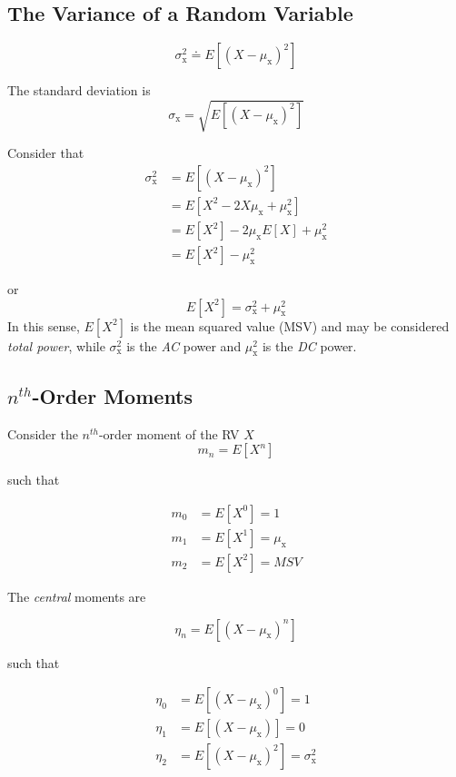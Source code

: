\documentclass[12pt]{book}
\theoremstyle{definition}
\begin{document}
\subsection{The Variance of a Random Variable}


\[
\sigma_\mathrm{x}^2 \doteq E[(X - \mu_\mathrm{x})^2]
\]

The standard deviation is
\[
\sigma_\mathrm{x} = \sqrt{E[(X - \mu_\mathrm{x})^2]}
\]

Consider that 
\[    \begin{split}
        \sigma_\mathrm{x}^2  & = E[(X - \mu_\mathrm{x})^2]\\
                    & = E[X^2 - 2X\mu_\mathrm{x} + \mu_\mathrm{x}^2]\\
                    & = E[X^2] - 2\mu_\mathrm{x} E[X] +\mu_\mathrm{x}^2\\
                    & = E[X^2] - \mu_\mathrm{x}^2
\end{split}
\]

or 
\[
E[X^2] = \sigma_\mathrm{x}^2 + \mu_\mathrm{x}^2
\]
In this sense, \(E[X^2]\) is the mean squared value (MSV) and may be considered \emph{total power}, while \(\sigma_\mathrm{x}^2\) is the \emph{AC} power and \(\mu_\mathrm{x}^2\) is the \emph{DC} power. \\

\subsection{$n^{th}$-Order Moments}

Consider the $n^{th}$-order moment of the RV $X$
\[
m_n = E[X^n]
\]

such that 

\[    
\begin{split}
        m_0     & = E[X^0] = 1\\
        m_1     & = E[X^1] = \mu_\mathrm{x}\\
        m_2     & = E[X^2] = MSV
\end{split}
\]

The \emph{central} moments are

\[
\eta_n = E[(X-\mu_\mathrm{x})^n]
\]

such that 

\[    
\begin{split}
        \eta_0     & = E[(X-\mu_\mathrm{x})^0] = 1\\
        \eta_1     & = E[(X-\mu_\mathrm{x})] = 0\\
        \eta_2    & = E[(X-\mu_\mathrm{x})^2] = \sigma_\mathrm{x}^2
\end{split}
\]
\end{document}
